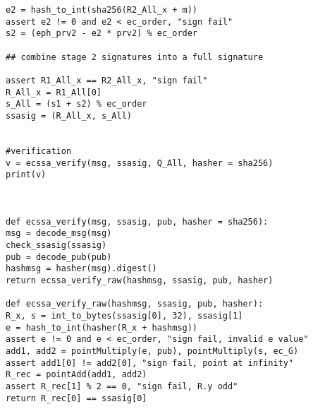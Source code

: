 \begin{verbatim}
e2 = hash_to_int(sha256(R2_All_x + m))
assert e2 != 0 and e2 < ec_order, "sign fail"
s2 = (eph_prv2 - e2 * prv2) % ec_order

## combine stage 2 signatures into a full signature

assert R1_All_x == R2_All_x, "sign fail"
R_All_x = R1_All[0]
s_All = (s1 + s2) % ec_order
ssasig = (R_All_x, s_All)


#verification
v = ecssa_verify(msg, ssasig, Q_All, hasher = sha256)
print(v)



def ecssa_verify(msg, ssasig, pub, hasher = sha256):
msg = decode_msg(msg)
check_ssasig(ssasig)
pub = decode_pub(pub)
hashmsg = hasher(msg).digest()
return ecssa_verify_raw(hashmsg, ssasig, pub, hasher)

def ecssa_verify_raw(hashmsg, ssasig, pub, hasher):
R_x, s = int_to_bytes(ssasig[0], 32), ssasig[1]
e = hash_to_int(hasher(R_x + hashmsg))
assert e != 0 and e < ec_order, "sign fail, invalid e value"
add1, add2 = pointMultiply(e, pub), pointMultiply(s, ec_G)
assert add1[0] != add2[0], "sign fail, point at infinity"
R_rec = pointAdd(add1, add2)
assert R_rec[1] % 2 == 0, "sign fail, R.y odd"
return R_rec[0] == ssasig[0]

\end{verbatim}